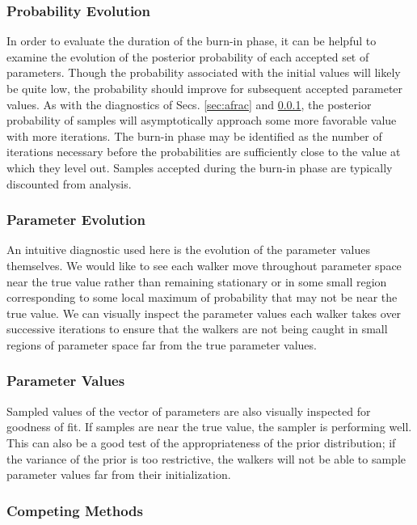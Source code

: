 \documentclass[preprint]{aastex}
\begin{document}
\clearpage
\subsubsection{Probability Evolution}
\label{sec:probs}

In order to evaluate the duration of the burn-in phase, it can be helpful to examine the evolution of the posterior probability of each accepted set of parameters.  Though the probability associated with the initial values will likely be quite low, the probability should improve for subsequent accepted parameter values.  As with the diagnostics of Secs. \ref{sec:afrac} and \ref{sec:probs}, the posterior probability of samples will asymptotically approach some more favorable value with more iterations.  The burn-in phase may be identified as the number of iterations necessary before the probabilities are sufficiently close to the value at which they level out.  Samples accepted during the burn-in phase are typically discounted from analysis.

\clearpage
\subsubsection{Parameter Evolution}
\label{sec:params}

An intuitive diagnostic used here is the evolution of the parameter values themselves.  We would like to see each walker move throughout parameter space near the true value rather than remaining stationary or in some small region corresponding to some local maximum of probability that may not be near the true value.  We can visually inspect the parameter values each walker takes over successive iterations to ensure that the walkers are not being caught in small regions of parameter space far from the true parameter values.

\clearpage
\subsubsection{Parameter Values}
\label{sec:samps}

Sampled values of the vector of parameters are also visually inspected for goodness of fit.  If samples are near the true value, the sampler is performing well.  This can also be a good test of the appropriateness of the prior distribution; if the variance of the prior is too restrictive, the walkers will not be able to sample parameter values far from their initialization.  

\clearpage
\subsubsection{Competing Methods}
\label{sec:sheldon}
\end{document}
